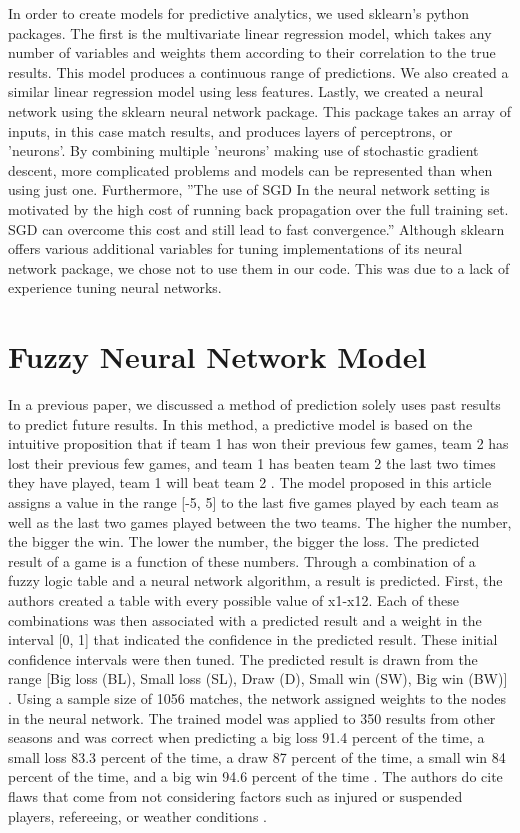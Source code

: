 \documentclass[sigconf]{acmart}
\begin{document}
In order to create models for predictive analytics, we used sklearn's python packages. The first is the multivariate linear regression model, which takes any number of variables and weights them according to their correlation to the true results. This model produces a continuous range of predictions. We also created a similar linear regression model using less features. Lastly, we created a neural network using the sklearn neural network package. This package takes an array of inputs, in this case match results, and produces layers of perceptrons, or 'neurons'. By combining multiple 'neurons' making use of stochastic gradient descent, more complicated problems and models can be represented than when using just one. Furthermore, ''The use of SGD In the neural network setting is motivated by the high cost of running back propagation over the full training set. SGD can overcome this cost and still lead to fast convergence.''\cite{StanfordSGD} Although sklearn offers various additional variables for tuning implementations of its neural network package, we chose not to use them in our code. This was due to a lack of experience tuning neural networks.

\section{Fuzzy Neural Network Model}
In a previous paper, we discussed a method of prediction solely uses past results to predict future results. In this method, a predictive model is based on the intuitive proposition that if team 1 has won their previous few games, team 2 has lost their previous few games, and team 1 has beaten team 2 the last two times they have played, team 1 will beat team 2 \cite{FuzzyModel}. The model proposed in this article assigns a value in the range [-5, 5] to the last five games played by each team as well as the last two games played between the two teams. The higher the number, the bigger the win. The lower the number, the bigger the loss. The predicted result of a game is a function of these numbers. Through a combination of a fuzzy logic table and a neural network algorithm, a result is predicted. First, the authors created a table with every possible value of x1-x12. Each of these combinations was then associated with a predicted result and a weight in the interval [0, 1] that indicated the confidence in the predicted result. These initial confidence intervals were then tuned. The predicted result is drawn from the range [Big loss (BL), Small loss (SL), Draw (D), Small win (SW), Big win (BW)] \cite{FuzzyModel}. Using a sample size of 1056 matches, the network assigned weights to the nodes in the neural network. The trained model was applied to 350 results from other seasons and was correct when predicting a big loss 91.4 percent of the time, a small loss 83.3 percent of the time, a draw 87 percent of the time, a small win 84 percent of the time, and a big win 94.6 percent of the time \cite{FuzzyModel}. The authors do cite flaws that come from not considering factors such as injured or suspended players, refereeing, or weather conditions \cite{FuzzyModel}.
\end{document}
